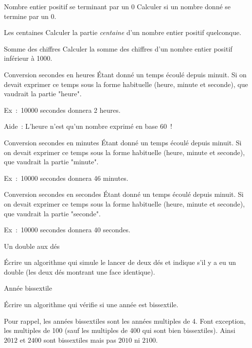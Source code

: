 	\begin{Exercice}{Nombre entier positif se terminant par un 0}
		Calculer si un nombre donné se termine par un 0.
	\end{Exercice}

	\begin{Exercice}{Les centaines}
		Calculer la partie \emph{centaine}
		d’un nombre entier positif quelconque.
	\end{Exercice}

	\begin{Exercice}{Somme des chiffres}
		Calculer la somme des chiffres
		d’un nombre entier positif inférieur à 1000.
	\end{Exercice}

	\begin{Exercice}{Conversion secondes en heures}
		Étant donné un temps écoulé depuis minuit.
		Si on devait exprimer ce temps sous la forme
		habituelle (heure, minute et seconde),
		que vaudrait la partie "heure".

		Ex~:~10000 secondes donnera 2 heures.

		Aide~: L’heure n’est qu’un nombre exprimé en base 60~!
	\end{Exercice}

	\begin{Exercice}{Conversion secondes en minutes}
		Étant donné un temps écoulé depuis minuit.
		Si on devait exprimer ce temps sous la forme
		habituelle (heure, minute et seconde),
		que vaudrait la partie "minute".

		Ex~:~10000 secondes donnera 46 minutes.
	\end{Exercice}

	\begin{Exercice}{Conversion secondes en secondes}
		Étant donné un temps écoulé depuis minuit.
		Si on devait exprimer ce temps sous la forme
		habituelle (heure, minute et seconde),
		que vaudrait la partie "seconde".

		Ex~:~10000 secondes donnera 40 secondes.
	\end{Exercice}	

	\begin{Exercice}{Un double aux dés}

		Écrire un algorithme qui simule le lancer de deux dés
		et indique s’il y a eu un double 
		(les deux dés montrant une face identique).
	\end{Exercice}

	\begin{Exercice}{Année bissextile}

		\label{ex:bissextile}
		Écrire un algorithme qui vérifie si une année est bissextile.

		Pour rappel, les années bissextiles sont les années multiples de 4. 
		Font exception, les multiples de 100 
		(sauf les multiples de 400 qui sont bien bissextiles). 
		Ainsi $2012$ et $2400$ sont bissextiles mais pas $2010$ ni $2100$.
	\end{Exercice}



